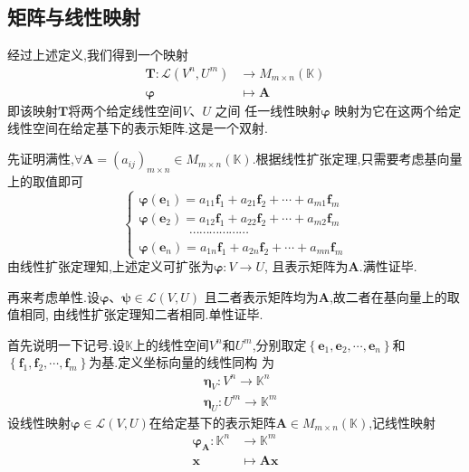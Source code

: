 \subsection{矩阵与线性映射}
\begin{formal}
\begin{definition}[线性映射与矩阵]\label{def:线性映射与矩阵}
    经过上述定义,我们得到一个映射
    \begin{align*}
    \bm{T}:
    \mathcal{L}\left(
        V^n,U^m
    \right) &\longrightarrow
    M_{m\times n}\left(\mathbb{K}
    \right)\\
    \bm{\varphi} &\longmapsto
    \bm{A}
    \end{align*}
    即该映射$\bm{T}$将两个给定线性空间$V$、$U$
    之间
    任一线性映射$\bm{\varphi}$
    映射为它在这两个给定
    线性空间在给定基下的表示矩阵.这是一个双射.
\end{definition}
\begin{Proof}
先证明满性,$\forall \bm{A}=\left(a_{ij}\right)_{m\times n}\in M_{m\times n}\left(\mathbb{K}
\right)$.根据线性扩张定理,只需要考虑基向量上的取值即可
\[
\begin{cases*}
        \bm{\varphi}\left(\bm{e}_1
        \right) = a_{11}\bm{f}_1+a_{21}\bm{f}_2
        +\cdots+a_{m1}\bm{f}_m\\
        \bm{\varphi}\left(\bm{e}_2
        \right) = a_{12}\bm{f}_1+a_{22}\bm{f}_2
        +\cdots+a_{m2}\bm{f}_m\\
        \qquad\qquad\cdots\cdots\cdots
        \cdots\cdots\cdots\\
        \bm{\varphi}\left(\bm{e}_n
        \right) = a_{1n}\bm{f}_1+a_{2n}\bm{f}_2
        +\cdots+a_{mn}\bm{f}_m
    \end{cases*}
\]
由线性扩张定理知,上述定义可扩张为$\bm{\varphi}:V\longrightarrow U$,
且表示矩阵为$\bm{A}$.满性证毕.

再来考虑单性.设$\bm{\varphi}$、$\bm{\psi}\in \mathcal{L}\left(V,U\right)$
且二者表示矩阵均为$\bm{A}$,故二者在基向量上的取值相同,
由线性扩张定理知二者相同.单性证毕.
\end{Proof}
\end{formal}
\begin{red}
\begin{remark}
    首先说明一下记号.设$\mathbb{K}$上的线性空间$
    V^n$和$U^m$,分别取定$\left\{
        \bm{e}_1,\bm{e}_2,\cdots,\bm{e}_n
    \right\}$和$\left\{
        \bm{f}_1,\bm{f}_2,\cdots,\bm{f}_m
    \right\}$为基.定义坐标向量的线性同构
    为
    \begin{align*}
     &   \bm{\eta}_V:V^n\longrightarrow \mathbb{K}^n\\
      &  \bm{\eta}_U:U^m\longrightarrow \mathbb{K}^m
    \end{align*}
    设线性映射$\bm{\varphi}\in \mathcal{L}\left(
        V,U
    \right)$在给定基下的表示矩阵$\bm{A}\in M_{m \times n}\left(\mathbb{K}
    \right)$,记线性映射
    \begin{align*}
        \bm{\varphi}_{\bm{A}}:
        \mathbb{K}^n &\longrightarrow
        \mathbb{K}^m\\
        \bm{x} &\longmapsto
        \bm{Ax}
    \end{align*}
\end{remark}
\end{red}
